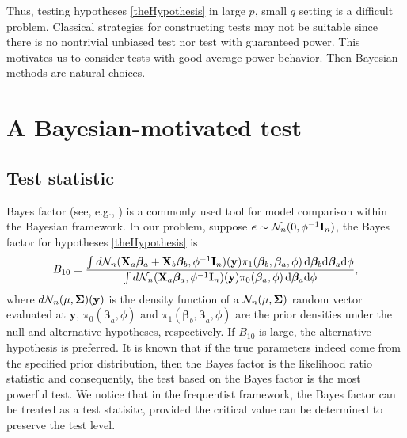 \documentclass[smallextended]{svjour3}       %
\newcommand{\By}{\mathbf{y}}    \newcommand{\Bz}{\mathbf{z}}
\newcommand{\bfsym}[1]{\ensuremath{\boldsymbol{#1}}}
\def\bbeta{\bfsym \beta}
\begin{document}
Thus, testing hypotheses \eqref{theHypothesis} in large $p$, small $q$ setting is a difficult problem.
Classical strategies for constructing tests may not be suitable since there is no nontrivial unbiased test nor test with guaranteed power.
This motivates us to consider tests with good average power behavior.
Then Bayesian methods are natural choices.



\section{A Bayesian-motivated test}\label{sec:methodology}
\subsection{Test statistic}

Bayes factor (see, e.g., \cite{Robert1995Bayes}) is a commonly used tool for model comparison within the Bayesian framework.
In our problem, suppose $\bepsilon \sim \mathcal N_n (0,\phi^{-1} \BI_n)$, the Bayes factor for hypotheses \eqref{theHypothesis} is
\begin{equation*}
    B_{10}= \frac {
        \int d\mathcal N_n(\BX_a\bbeta_a + \BX_b\bbeta_b, \phi^{-1}\BI_n) (\By) \pi_1(\bbeta_b,\bbeta_a,\phi)\, \mathrm d\bbeta_b \mathrm d\bbeta_a \mathrm d\phi
}{
    \int d\mathcal N_n(\BX_a\bbeta_a, \phi^{-1} \BI_n)(\By) \pi_0(\bbeta_a,\phi) \, \mathrm d\bbeta_a \mathrm d\phi
    },
\end{equation*}
where $d\mathcal N_n(\mu, \bSigma)(\By)$ is the density function of a $\mathcal N_n(\mu,\bSigma) $ random vector evaluated at $\By$,  $\pi_0(\bbeta_a,\phi)$ and $\pi_1(\bbeta_b,\bbeta_a,\phi)$ are the prior densities under the null and alternative hypotheses, respectively.
If $B_{10}$ is large, the alternative hypothesis is preferred.
It is known that if the true parameters indeed come from the specified prior distribution, then the Bayes factor is the likelihood ratio statistic and consequently, the test based on the Bayes factor is the most powerful test.
We notice that in the frequentist framework, the Bayes factor can be treated as a test statisitc, provided the critical value can be determined to preserve the test level.
\end{document}
